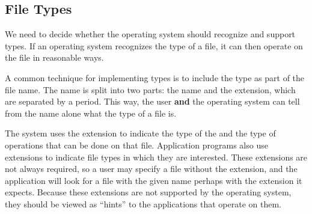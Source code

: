 \subsection{File Types}\label{subsec:File_Types}
We need to decide whether the operating system should recognize and support  types.
If an operating system recognizes the type of a file, it can then operate on the file in reasonable ways.

A common technique for implementing  types is to include the type as part of the file name.
The name is split into two parts: the name and the extension, which are separated by a period.
This way, the user \textbf{and} the operating system can tell from the name alone what the type of a file is.

The system uses the extension to indicate the type of the  and the type of operations that can be done on that file.
Application programs also use extensions to indicate file types in which they are interested.
These extensions are not always required, so a user may specify a file without the extension, and the application will look for a file with the given name perhaps with the extension it expects.
Because these extensions are not supported by the operating system, they should be viewed as ``hints'' to the applications that operate on them.

